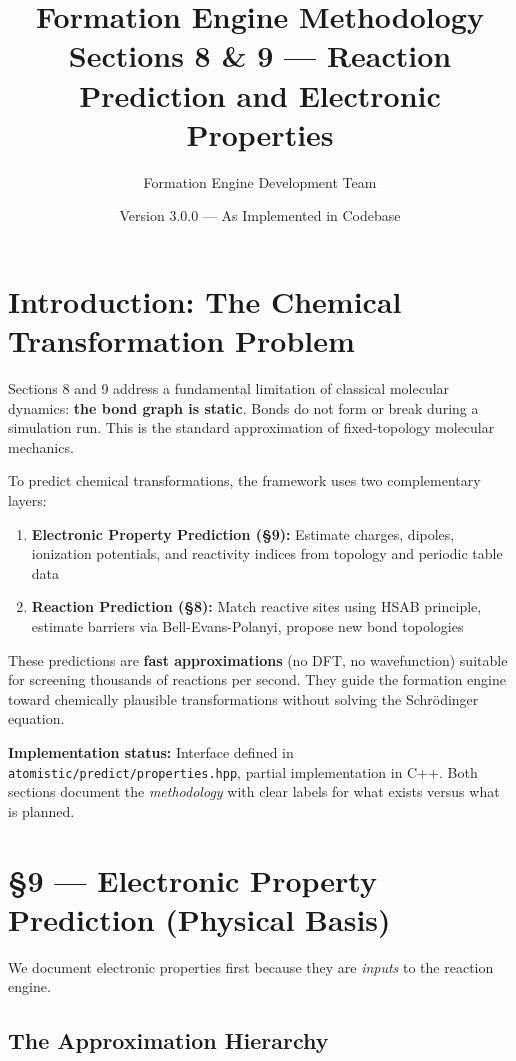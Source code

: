 \documentclass[11pt]{article}
\title{\textbf{Formation Engine Methodology} \\
\Large Sections 8 \& 9 — Reaction Prediction and Electronic Properties}
\author{Formation Engine Development Team}
\date{Version 3.0.0 — As Implemented in Codebase}
\begin{document}
\maketitle

\section{Introduction: The Chemical Transformation Problem}

Sections 8 and 9 address a fundamental limitation of classical molecular dynamics: \textbf{the bond graph is static}. Bonds do not form or break during a simulation run. This is the standard approximation of fixed-topology molecular mechanics.

To predict chemical transformations, the framework uses two complementary layers:

\begin{enumerate}
\item \textbf{Electronic Property Prediction (§9):} Estimate charges, dipoles, ionization potentials, and reactivity indices from topology and periodic table data
\item \textbf{Reaction Prediction (§8):} Match reactive sites using HSAB principle, estimate barriers via Bell-Evans-Polanyi, propose new bond topologies
\end{enumerate}

These predictions are \textbf{fast approximations} (no DFT, no wavefunction) suitable for screening thousands of reactions per second. They guide the formation engine toward chemically plausible transformations without solving the Schrödinger equation.

\textbf{Implementation status:} Interface defined in \texttt{atomistic/predict/properties.hpp}, partial implementation in C++. Both sections document the \textit{methodology} with clear labels for what exists versus what is planned.

\section{§9 — Electronic Property Prediction (Physical Basis)}

We document electronic properties first because they are \textit{inputs} to the reaction engine.

\subsection{The Approximation Hierarchy}
\end{document}
